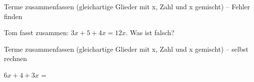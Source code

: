 \begin{aufgabe}{Terme zusammenfassen (gleichartige Glieder mit x, Zahl und x gemischt) – Fehler finden}
\begin{teile}
\teil Tom fasst zusammen: $3x + 5 + 4x = 12x$. Was ist falsch?
\end{teile}
\end{aufgabe}

\begin{aufgabe}{Terme zusammenfassen (gleichartige Glieder mit x, Zahl und x gemischt) – selbst rechnen}
\begin{teile}
\teil $6x + 4 + 3x$ = \leerfeld
\end{teile}
\end{aufgabe}
